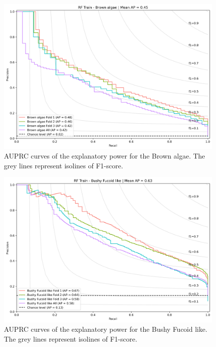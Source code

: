 \begin{figure}
\hypertarget{fig:chap3figS23}{%
\centering
\includegraphics{03-Chapitre3/figures/supplementary/03-precision_recall_curve_train_rf_Brown algae.png}
\caption{AUPRC curves of the explanatory power for the Brown algae. The
grey lines represent isolines of F1-score.}\label{fig:chap3figS23}
}
\end{figure}

\begin{figure}
\hypertarget{fig:chap3figS24}{%
\centering
\includegraphics{03-Chapitre3/figures/supplementary/03-precision_recall_curve_train_rf_Bushy Fucoid like.png}
\caption{AUPRC curves of the explanatory power for the Bushy Fucoid
like. The grey lines represent isolines of
F1-score.}\label{fig:chap3figS24}
}
\end{figure}

